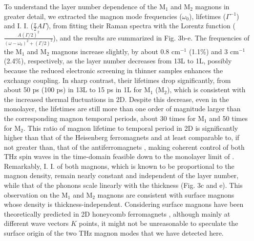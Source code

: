 \documentclass[prl, preprint, superscriptaddress]{revtex4-1}
\begin{document}
To understand the layer number dependence of the $\mathrm{M_1}$ and $\mathrm{M_2}$ magnons in greater detail, we extracted the magnon mode frequencies ($\omega_\mathrm{0}$), lifetimes ($\varGamma^{-1}$) and I. I. ($\frac{\pi}{2}A\varGamma$), from fitting their Raman spectra with the Lorentz function ($\frac{A(\varGamma/2)^2}{(\omega-{\omega}_\mathrm{0})^2+(\varGamma/2)^2}$), and the results are summarized in Fig. 3b-e. The frequencies of the $\mathrm{M_1}$ and $\mathrm{M_2}$ magnons increase slightly, by about 0.8 $\mathrm{cm}^{-1}$ (1.1\%) and 3 $\mathrm{cm}^{-1}$ (2.4\%), respectively, as the layer number decreases from 13L to 1L, possibly because the reduced electronic screening in thinner samples enhances the exchange coupling. In sharp contrast, their lifetimes drop significantly, from about 50 ps (100 ps) in 13L to 15 ps in 1L for $\mathrm{M_1}$ ($\mathrm{M_2}$), which is consistent with the increased thermal fluctuations in 2D. Despite this decrease, even in the monolayer, the lifetimes are still more than one order of magnitude larger than the corresponding magnon temporal periods, about 30 times for $\mathrm{M_1}$ and 50 times for  $\mathrm{M_2}$. This ratio of magnon lifetime to temporal period in 2D  is significantly higher than that of the Heisenberg ferromagnets \cite{Koopmans2005, Kirilyuk2010} and at least comparable to, if not greater than, that of the antiferromagnets \cite{Kirilyuk2010, Jungwirth2016, Baltz2018}, making coherent control of both THz spin waves in the time-domain feasible down to the monolayer limit of . Remarkably, I. I. of both magnons, which is known to be proportional to the magnon density, remain nearly constant and independent of the layer number, while that of the phonons scale linearly with the thickness (Fig. 3c and e). This observation on the $\mathrm{M_1}$ and $\mathrm{M_2}$ magnons are consistent with surface magnons whose density is thickness-independent. Considering surface magnons have been theoretically predicted in 2D honeycomb ferromagnets \cite{Pershoguba2018}, although mainly at different wave vectors $K$ points, it might not be unreasonable to speculate the surface origin of the two THz magnon modes that we have detected here.
\end{document}
